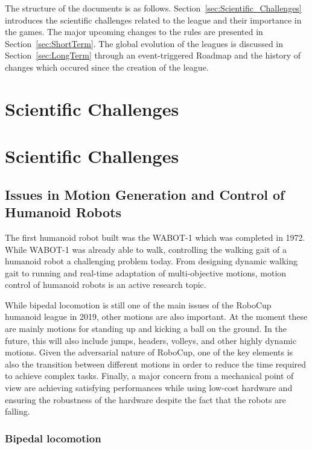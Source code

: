 \documentclass{article}
\begin{document}
The structure of the documents is as
follows. Section~\ref{sec:Scientific_Challenges} introduces the scientific
challenges related to the league and their importance in the games. The major
upcoming changes to the rules are presented in Section~\ref{sec:ShortTerm}. The
global evolution of the leagues is discussed in Section~\ref{sec:LongTerm}
through an event-triggered Roadmap and the history of changes which occured
since the creation of the league.

\section{\label{sec:Scientific_Challenges}Scientific Challenges}

\section{\label{sec:ScientificProblematics}Scientific Challenges}

\subsection{Issues in Motion Generation and Control of Humanoid Robots}

The first humanoid robot built was the WABOT-1 which was completed in 1972. 
While WABOT-1 was already able to walk, controlling the walking gait of a humanoid robot a challenging problem today. 
From designing dynamic walking gait to running and real-time adaptation of multi-objective motions, motion control of humanoid robots is an active research topic.

While bipedal locomotion is still one of the main issues of the RoboCup humanoid
league in 2019, other motions are also important. 
At the moment these are mainly motions for standing up and kicking a ball on the ground.
In the future, this will also include jumps, headers, volleys, and other highly dynamic motions.
Given the adversarial nature of RoboCup, one of the key elements is also the transition between different motions in order to reduce the time required to achieve complex tasks. 
Finally, a major concern from a mechanical point of view are achieving satisfying performances while using low-cost hardware and ensuring the robustness of the hardware despite the fact that the robots are falling.

\subsubsection{Bipedal locomotion}
\end{document}
